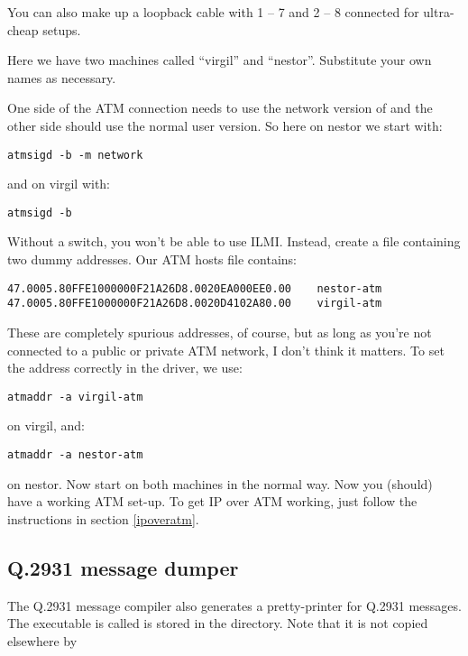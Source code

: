 You can also make up a loopback cable with 1 -- 7 and 2 -- 8 connected for
ultra-cheap setups.

Here we have two machines called ``virgil'' and ``nestor''.
Substitute your own names as necessary.

One side of the ATM connection needs to use the network version of
 and the other side should use the normal user version.
So here on nestor we start  with:

\begin{verbatim}
atmsigd -b -m network
\end{verbatim}

and on virgil with:

\begin{verbatim}
atmsigd -b
\end{verbatim}

Without a switch, you won't be able to use ILMI. Instead, create a
 file containing two dummy addresses.
Our ATM hosts file contains:

\begin{verbatim}
47.0005.80FFE1000000F21A26D8.0020EA000EE0.00    nestor-atm
47.0005.80FFE1000000F21A26D8.0020D4102A80.00    virgil-atm
\end{verbatim}

These are completely spurious addresses, of course, but as long as you're
not connected to a public or private ATM network, I don't think it matters.
To set the address correctly in the driver, we use:

\begin{verbatim}
atmaddr -a virgil-atm
\end{verbatim}

on virgil, and:

\begin{verbatim}
atmaddr -a nestor-atm
\end{verbatim}

on nestor. Now start  on both machines
in the normal way. Now you (should) have a working ATM set-up. To get
IP over ATM working, just follow the instructions in
section \ref{ipoveratm}.


\subsection{Q.2931 message dumper}

The Q.2931 message compiler also generates a pretty-printer for Q.2931
messages. The executable is called  is stored in the
 directory. Note that it is not copied elsewhere by

